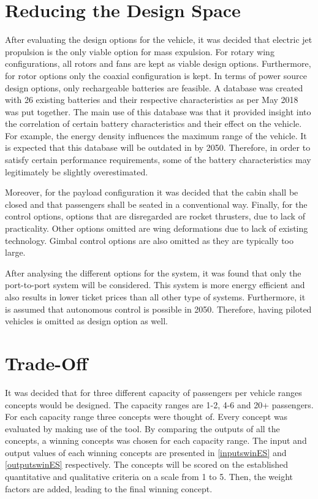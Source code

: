 \section{Reducing the Design Space}
After evaluating the design options for the vehicle, it was decided that electric jet propulsion is the only viable option for mass expulsion. For rotary wing configurations, all rotors and fans are kept as viable design options. Furthermore, for rotor options only the coaxial configuration is kept. In terms of power source design options, only rechargeable batteries are feasible. A database was created with 26 existing batteries and their respective characteristics as per May 2018 was put together. The main use of this database was that it provided insight into the correlation of certain battery characteristics and their effect on the vehicle. For example, the energy density influences the maximum range of the vehicle. It is expected that this database will be outdated in by 2050. Therefore, in order to satisfy certain performance requirements, some of the battery characteristics may legitimately be slightly overestimated. 

Moreover, for the payload configuration it was decided that the cabin shall be closed and that passengers shall be seated in a conventional way. Finally, for the control options, options that are disregarded are rocket thrusters, due to lack of practicality. Other options omitted are wing deformations due to lack of existing technology. Gimbal control options are also omitted as they are typically too large. 

After analysing the different options for the system, it was found that only the port-to-port system will be considered. This system is more energy efficient and also results in lower ticket prices than all other type of systems. Furthermore, it is assumed that autonomous control is possible in 2050. Therefore, having piloted vehicles is omitted as design option as well.

\section{Trade-Off}
It was decided that for three different capacity of passengers per vehicle ranges concepts would be designed. The capacity ranges are 1-2, 4-6 and 20+ passengers. For each capacity range three concepts were thought of. Every concept was evaluated by making use of the tool. By comparing the outputs of all the concepts, a winning concepts was chosen for each capacity range. The input and output values of each winning concepts are presented in \autoref{inputswinES} and \autoref{outputswinES} respectively. The concepts will be scored on the established quantitative and qualitative criteria on a scale from 1 to 5. Then, the weight factors are added, leading to the final winning concept. 

